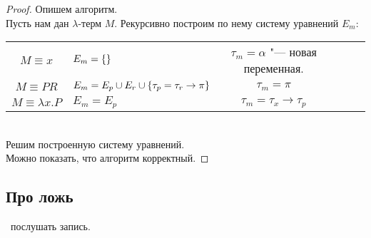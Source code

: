 \begin{proof}
    Опишем алгоритм.\\
    Пусть нам дан $\lambda$-терм $M$. Рекурсивно построим по нему систему уравнений $E_m$: \\
    \begin{tabular}{Sl|Sl|Sl}
        $M \equiv x$ & $E_m=\left\{\right\}$ & $\tau_m=\alpha$ "--- новая переменная. \\
        $M \equiv PR$ & $E_m=E_p \cup E_r \cup \left\{\tau_p=\tau_r\rightarrow\pi\right\}$ & $\tau_m=\pi$ \\
        $M \equiv \lambda x . P$ & $E_m=E_p$ & $\tau_m=\tau_x\rightarrow\tau_p$ \\
    \end{tabular} \\
    Решим построенную систему уравнений.\\
    Можно показать, что алгоритм корректный.
\end{proof}

\begin{example}
    \todo %
\end{example}

\subsection{\texorpdfstring{Про ложь}{About false}}

\todo\ послушать запись. %
